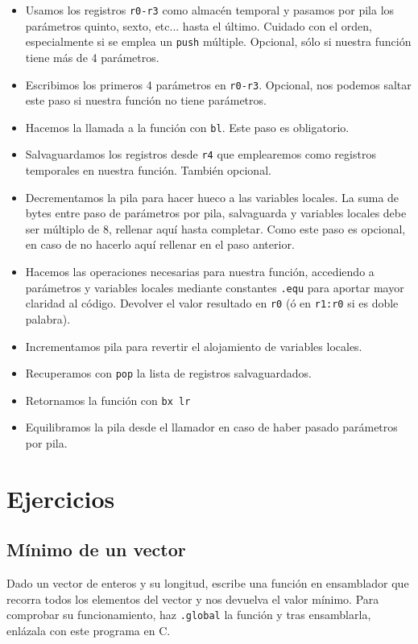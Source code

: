 \begin{itemize}
  \item Usamos los registros {\tt r0-r3} como almacén temporal y pasamos por pila
        los parámetros quinto, sexto, etc... hasta el último. Cuidado con el orden,
        especialmente si se emplea un {\tt push} múltiple. Opcional, sólo si nuestra
        función tiene más de 4 parámetros.
  \item Escribimos los primeros 4 parámetros en {\tt r0-r3}. Opcional, nos podemos saltar
        este paso si nuestra función no tiene parámetros.
  \item Hacemos la llamada a la función con {\tt bl}. Este paso es obligatorio.
  \item Salvaguardamos los registros desde {\tt r4} que emplearemos como registros
        temporales en nuestra función. También opcional.
  \item Decrementamos la pila para hacer hueco a las variables locales. La suma de bytes
        entre paso de parámetros por pila, salvaguarda y variables locales debe ser
        múltiplo de 8, rellenar aquí hasta completar. Como este paso es opcional, en caso
        de no hacerlo aquí rellenar en el paso anterior.
  \item Hacemos las operaciones necesarias para nuestra función, accediendo a parámetros
        y variables locales mediante constantes {\tt .equ} para aportar mayor claridad
        al código. Devolver el valor resultado en {\tt r0} (ó en {\tt r1:r0} si es doble
        palabra).
  \item Incrementamos pila para revertir el alojamiento de variables locales.
  \item Recuperamos con {\tt pop} la lista de registros salvaguardados.
  \item Retornamos la función con {\tt bx lr}
  \item Equilibramos la pila desde el llamador en caso de haber pasado parámetros por pila.
\end{itemize}

\section{Ejercicios}

\subsection{Mínimo de un vector}

Dado un vector de enteros y su longitud, escribe una función en ensamblador
que recorra todos los elementos del vector y nos devuelva el valor mínimo.
Para comprobar su funcionamiento, haz {\tt .global} la función y tras ensamblarla,
enlázala con este programa en C.


